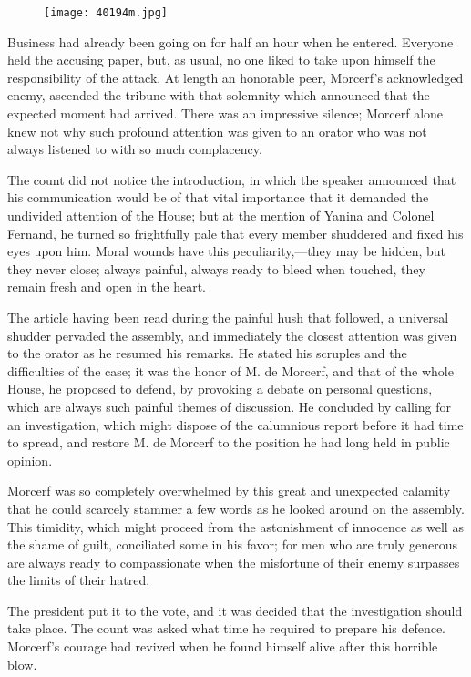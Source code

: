 \begin{figure}[ht]
\texttt{[image: 40194m.jpg]}
\end{figure}

Business had already been going on for half an hour when he entered.
Everyone held the accusing paper, but, as usual, no one liked to take
upon himself the responsibility of the attack. At length an honorable
peer, Morcerf’s acknowledged enemy, ascended the tribune with that
solemnity which announced that the expected moment had arrived. There
was an impressive silence; Morcerf alone knew not why such profound
attention was given to an orator who was not always listened to with so
much complacency.

The count did not notice the introduction, in which the speaker
announced that his communication would be of that vital importance that
it demanded the undivided attention of the House; but at the mention of
Yanina and Colonel Fernand, he turned so frightfully pale that every
member shuddered and fixed his eyes upon him. Moral wounds have this
peculiarity,—they may be hidden, but they never close; always painful,
always ready to bleed when touched, they remain fresh and open in the
heart.

The article having been read during the painful hush that followed, a
universal shudder pervaded the assembly, and immediately the closest
attention was given to the orator as he resumed his remarks. He stated
his scruples and the difficulties of the case; it was the honor of M.
de Morcerf, and that of the whole House, he proposed to defend, by
provoking a debate on personal questions, which are always such painful
themes of discussion. He concluded by calling for an investigation,
which might dispose of the calumnious report before it had time to
spread, and restore M. de Morcerf to the position he had long held in
public opinion.

Morcerf was so completely overwhelmed by this great and unexpected
calamity that he could scarcely stammer a few words as he looked around
on the assembly. This timidity, which might proceed from the
astonishment of innocence as well as the shame of guilt, conciliated
some in his favor; for men who are truly generous are always ready to
compassionate when the misfortune of their enemy surpasses the limits
of their hatred.

The president put it to the vote, and it was decided that the
investigation should take place. The count was asked what time he
required to prepare his defence. Morcerf’s courage had revived when he
found himself alive after this horrible blow.

